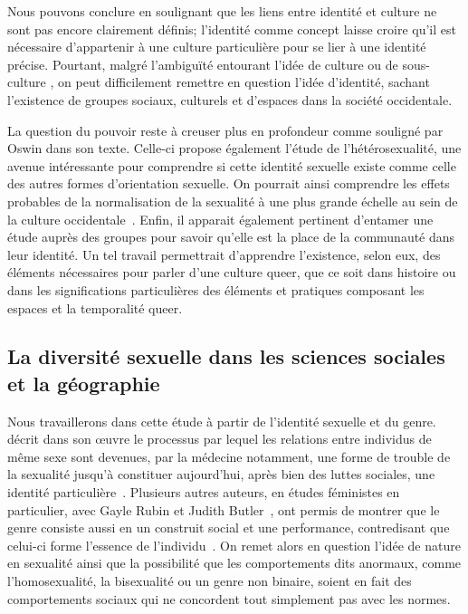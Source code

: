 Nous pouvons conclure en soulignant que les liens entre identité et culture ne sont pas encore clairement définis; l'identité comme concept laisse croire qu'il est nécessaire d'appartenir à une culture particulière pour se lier à une identité précise.
Pourtant, malgré l'ambiguïté entourant l'idée de culture ou de sous-culture \lgbt{}, on peut difficilement remettre en question l'idée d'identité, sachant l'existence de groupes sociaux, culturels et d'espaces \lgbt{} dans la société occidentale.

La question du pouvoir reste à creuser plus en profondeur comme souligné par Oswin dans son texte.
Celle-ci propose également l'étude de l'hétérosexualité, une avenue intéressante pour comprendre si cette identité sexuelle existe comme celle des autres formes d'orientation sexuelle.
On pourrait ainsi comprendre les effets probables de la normalisation de la sexualité à une plus grande échelle au sein de la culture occidentale~\citep[100]{Oswin2008}.
Enfin, il apparait également pertinent d’entamer une étude auprès des groupes \lgbt{} pour savoir qu'elle est la place de la communauté dans leur identité.
Un tel travail permettrait d'apprendre l'existence, selon eux, des éléments nécessaires pour parler d'une culture queer, que ce soit dans histoire ou dans les significations particulières des éléments et pratiques composant les espaces et la temporalité queer.

\subsection{La diversité sexuelle dans les sciences sociales et la géographie}
\label{ssub:la_diversit_sexuelle_dans_les_sciences_sociales_et_la_g_ographie}

Nous travaillerons dans cette étude à partir de l'identité sexuelle et du genre.
\citet{Foucault2011} décrit dans son œuvre  le processus par lequel les relations entre individus de même sexe sont devenues, par la médecine notamment, une forme de trouble de la sexualité jusqu'à constituer aujourd'hui, après bien des luttes sociales, une identité particulière~\citep{Foucault2011}.
Plusieurs autres auteurs, en études féministes en particulier, avec Gayle Rubin et Judith Butler~\citep[98]{Marcus2005}, ont permis de montrer que le genre consiste aussi en un construit social et une performance, contredisant que celui-ci forme l'essence de l'individu~\citep{Butler2007}.
On remet alors en question l'idée de nature en sexualité ainsi que la possibilité que les comportements dits anormaux, comme l'homosexualité, la bisexualité ou un genre non binaire, soient en fait des comportements sociaux qui ne concordent tout simplement pas avec les normes.

